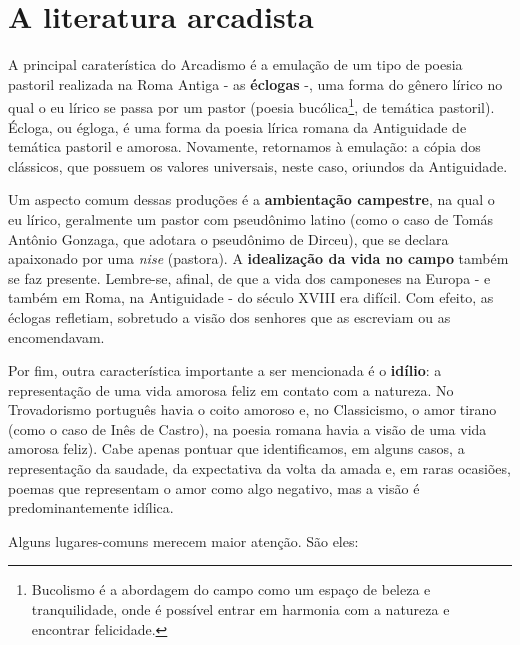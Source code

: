 \documentclass[12pt]{book}
\begin{document}
		\chapter{A literatura arcadista}
		\par A principal caraterística do Arcadismo é a emulação de um tipo de poesia pastoril realizada na Roma Antiga - as \textbf{éclogas} -, uma forma do gênero lírico no qual o eu lírico se passa por um pastor (poesia bucólica\footnote{Bucolismo é a abordagem do campo como um espaço de beleza e tranquilidade, onde é possível entrar em harmonia com a natureza e encontrar felicidade.}, de temática pastoril). Écloga, ou égloga, é uma forma da poesia lírica romana da Antiguidade de temática pastoril e amorosa. Novamente, retornamos à emulação: a cópia dos clássicos, que possuem os valores universais, neste caso, oriundos da Antiguidade.
		\par Um aspecto comum dessas produções é a \textbf{ambientação campestre}, na qual o eu lírico, geralmente um pastor com pseudônimo latino (como o caso de Tomás Antônio Gonzaga, que adotara o pseudônimo de Dirceu), que se declara apaixonado por uma \textit{nise} (pastora). A \textbf{idealização da vida no campo} também se faz presente. Lembre-se, afinal, de que a vida dos camponeses na Europa - e também em Roma, na Antiguidade - do século XVIII era difícil. Com efeito, as éclogas refletiam, sobretudo a visão dos senhores que as escreviam ou as encomendavam.
		\par Por fim, outra característica importante a ser mencionada é o \textbf{idílio}: a representação de uma vida amorosa feliz em contato com a natureza. No Trovadorismo português havia o coito amoroso e, no Classicismo, o amor tirano (como o caso de Inês de Castro), na poesia romana havia a visão de uma vida amorosa feliz). Cabe apenas pontuar que identificamos, em alguns casos, a representação da saudade, da expectativa da volta da amada e, em raras ocasiões, poemas que representam o amor como algo negativo, mas a visão é predominantemente idílica.
		\par Alguns lugares-comuns merecem maior atenção. São eles:
\end{document}
